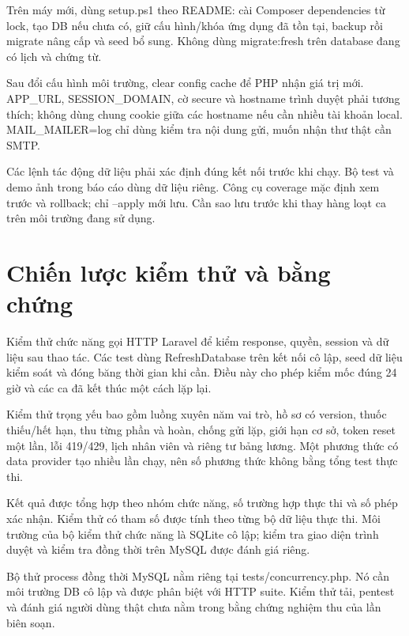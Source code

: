 Trên máy mới, dùng setup.\allowbreak{}ps1 theo README:\allowbreak{} cài Composer dependencies từ lock, tạo DB nếu chưa có, giữ cấu hình/\allowbreak{}khóa ứng dụng đã tồn tại, backup rồi migrate nâng cấp và seed bổ sung.\allowbreak{} Không dùng migrate:\allowbreak{}fresh trên database đang có lịch và chứng từ.\allowbreak{}

Sau đổi cấu hình môi trường, clear config cache để PHP nhận giá trị mới.\allowbreak{} APP\_\allowbreak{}URL, SESSION\_\allowbreak{}DOMAIN, cờ secure và hostname trình duyệt phải tương thích; không dùng chung cookie giữa các hostname nếu cần nhiều tài khoản local.\allowbreak{} MAIL\_\allowbreak{}MAILER=log chỉ dùng kiểm tra nội dung gửi, muốn nhận thư thật cần SMTP.\allowbreak{}

Các lệnh tác động dữ liệu phải xác định đúng kết nối trước khi chạy.\allowbreak{} Bộ test và demo ảnh trong báo cáo dùng dữ liệu riêng.\allowbreak{} Công cụ coverage mặc định xem trước và rollback; chỉ --apply mới lưu.\allowbreak{} Cần sao lưu trước khi thay hàng loạt ca trên môi trường đang sử dụng.\allowbreak{}


\section{Chiến lược kiểm thử và bằng chứng}
Kiểm thử chức năng gọi HTTP Laravel để kiểm response, quyền, session và dữ liệu sau thao tác.\allowbreak{} Các test dùng Refresh\allowbreak{}Database trên kết nối cô lập, seed dữ liệu kiểm soát và đóng băng thời gian khi cần.\allowbreak{} Điều này cho phép kiểm mốc đúng 24 giờ và các ca đã kết thúc một cách lặp lại.\allowbreak{}

Kiểm thử trọng yếu bao gồm luồng xuyên năm vai trò, hồ sơ có version, thuốc thiếu/\allowbreak{}hết hạn, thu từng phần và hoàn, chống gửi lặp, giới hạn cơ sở, token reset một lần, lỗi 419/\allowbreak{}429, lịch nhân viên và riêng tư bảng lương.\allowbreak{} Một phương thức có data provider tạo nhiều lần chạy, nên số phương thức không bằng tổng test thực thi.\allowbreak{}

Kết quả được tổng hợp theo nhóm chức năng, số trường hợp thực thi và số phép xác nhận.\allowbreak{} Kiểm thử có tham số được tính theo từng bộ dữ liệu thực thi.\allowbreak{} Môi trường của bộ kiểm thử chức năng là SQLite cô lập; kiểm tra giao diện trình duyệt và kiểm tra đồng thời trên My\allowbreak{}SQL được đánh giá riêng.\allowbreak{}

Bộ thử process đồng thời My\allowbreak{}SQL nằm riêng tại tests/\allowbreak{}concurrency.\allowbreak{}php.\allowbreak{} Nó cần môi trường DB cô lập và được phân biệt với HTTP suite.\allowbreak{} Kiểm thử tải, pentest và đánh giá người dùng thật chưa nằm trong bằng chứng nghiệm thu của lần biên soạn.\allowbreak{}


